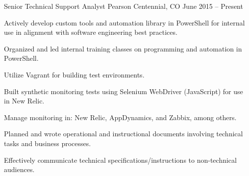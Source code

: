 \cventry
	{Senior Technical Support Analyst} %
	{Pearson} %
	{Centennial, CO} %
	{June 2015 – Present} %
	{
	  	\begin{cvitems} %
	        \item {Actively develop custom tools and automation library in PowerShell for internal use in alignment with software engineering best practices.}
			\item {Organized and led internal training classes on programming and automation in PowerShell.}
			\item {Utilize Vagrant for building test environments.}
			\item {Built synthetic monitoring tests using Selenium WebDriver (JavaScript) for use in New Relic.}
			\item {Manage monitoring in: New Relic, AppDynamics, and Zabbix, among others.}
			\item {Planned and wrote operational and instructional documents involving technical tasks and business processes.}
			\item {Effectively communicate technical specifications/instructions to non-technical audiences.}
		\end{cvitems}
	}